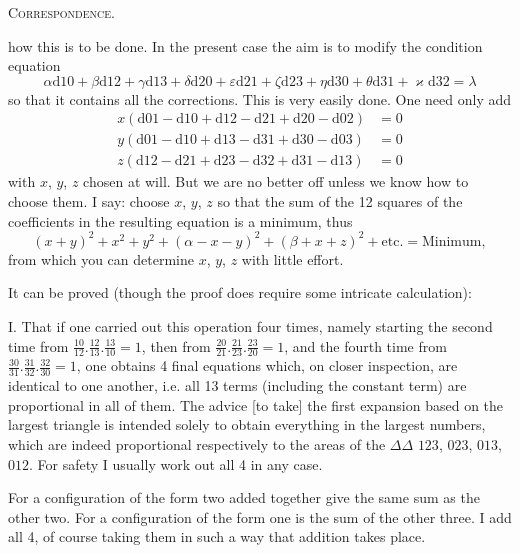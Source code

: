 \begingroup
\clearpage
{}\hfill\textsc{Correspondence.}\hfill\mbox{}\par\medskip
\noindent how this is to be done. In the present case the aim is to modify the condition equation
\[
\alpha\mathrm d10+\beta\mathrm d12+\gamma\mathrm d13+\delta\mathrm d20+\varepsilon\mathrm d21+\zeta\mathrm d23+\eta\mathrm d30+\theta\mathrm d31+\varkappa\mathrm d32=\lambda
\]
so that it contains all the corrections. This is very easily done. One need only add
\[
\begin{aligned}
x(\mathrm d01-\mathrm d10+\mathrm d12-\mathrm d21+\mathrm d20-\mathrm d02)&=0\\
y(\mathrm d01-\mathrm d10+\mathrm d13-\mathrm d31+\mathrm d30-\mathrm d03)&=0\\
z(\mathrm d12-\mathrm d21+\mathrm d23-\mathrm d32+\mathrm d31-\mathrm d13)&=0
\end{aligned}
\]
with $x$, $y$, $z$ chosen at will. But we are no better off unless we know how to choose them. I say: choose $x$, $y$, $z$ so that the sum of the 12 squares of the coefficients in the resulting equation is a minimum, thus
\[
(x+y)^2+x^2+y^2+(\alpha-x-y)^2+(\beta+x+z)^2+\text{etc.}=\text{Minimum},
\]
from which you can determine $x$, $y$, $z$ with little effort.

It can be proved (though the proof does require some intricate calculation):

I. That if one carried out this operation four times, namely starting the second time from $\frac{10}{12}.\frac{12}{13}.\frac{13}{10}=1$, then from $\frac{20}{21}.\frac{21}{23}.\frac{23}{20}=1$, and the fourth time from $\frac{30}{31}.\frac{31}{32}.\frac{32}{30}=1$, one obtains 4 final equations which, on closer inspection, are identical to one another, i.e. all 13 terms (including the constant term) are proportional in all of them. The advice [to take] the first expansion based on the largest triangle is intended solely to obtain everything in the largest numbers, which are indeed proportional respectively to the areas of the $\Delta\Delta$ $123$, $023$, $013$, $012$. For safety I usually work out all 4 in any case.

For a configuration of the form  two added together give the same sum as the other two. For a configuration of the form  one is the sum of the other three. I add all 4, of course taking them in such a way that  addition takes place.

